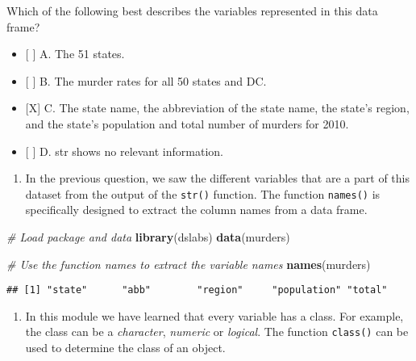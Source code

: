 \documentclass[]{article}
\newenvironment{Shaded}{\begin{snugshade}}{\end{snugshade}}
\newcommand{\CommentTok}[1]{\textcolor[rgb]{0.56,0.35,0.01}{\textit{#1}}}
\newcommand{\KeywordTok}[1]{\textcolor[rgb]{0.13,0.29,0.53}{\textbf{#1}}}
\newcommand{\NormalTok}[1]{#1}
\providecommand{\tightlist}{%
  \setlength{\itemsep}{0pt}\setlength{\parskip}{0pt}}
\begin{document}
Which of the following best describes the variables represented in this
data frame?

\begin{itemize}
\tightlist
\item
  {[} {]} A. The 51 states.
\item
  {[} {]} B. The murder rates for all 50 states and DC.
\item
  {[}X{]} C. The state name, the abbreviation of the state name, the
  state's region, and the state's population and total number of murders
  for 2010.
\item
  {[} {]} D. str shows no relevant information.
\end{itemize}

\begin{enumerate}
\def\labelenumi{\arabic{enumi}.}
\setcounter{enumi}{1}
\tightlist
\item
  In the previous question, we saw the different variables that are a
  part of this dataset from the output of the \texttt{str()} function.
  The function \texttt{names()} is specifically designed to extract the
  column names from a data frame.
\end{enumerate}

\begin{Shaded}
\begin{Highlighting}[]
\CommentTok{# Load package and data}
\KeywordTok{library}\NormalTok{(dslabs)}
\KeywordTok{data}\NormalTok{(murders)}
\end{Highlighting}
\end{Shaded}

\begin{Shaded}
\begin{Highlighting}[]
\CommentTok{# Use the function names to extract the variable names }
\KeywordTok{names}\NormalTok{(murders)}
\end{Highlighting}
\end{Shaded}

\begin{verbatim}
## [1] "state"      "abb"        "region"     "population" "total"
\end{verbatim}

\begin{enumerate}
\def\labelenumi{\arabic{enumi}.}
\setcounter{enumi}{2}
\tightlist
\item
  In this module we have learned that every variable has a class. For
  example, the class can be a \emph{character}, \emph{numeric} or
  \emph{logical}. The function \texttt{class()} can be used to determine
  the class of an object.
\end{enumerate}
\end{document}
